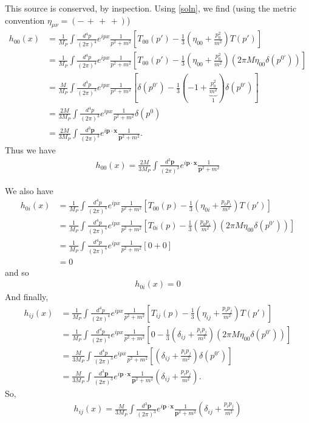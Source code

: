 \documentclass{book}
\theoremstyle{definition}
\newcommand{\nn}{\nonumber}
\newcommand{\f}[2]{\frac{#1}{#2}}
\newcommand{\lp}{\left(}
\newcommand{\rp}{\right)}
\newcommand{\lb}{\left[}
\newcommand{\rb}{\right]}
\begin{document}
This source is conserved, by inspection. Using \eqref{soln}, we find (using the metric convention $\eta_{\mu\nu} = (-\,+\,+\,+)$)
\begin{align}
h_{00}(x) &= \f{1}{M_P}\int \f{d^4p}{(2\pi)^4}e^{ipx}\f{1}{p^2 + m^2}\lb T_{00}(p') - \f{1}{3}\lp \eta_{00} + \f{p_0^2}{m^2} \rp T(p') \rb\nn\\
&= \f{1}{M_P}\int \f{d^4p}{(2\pi)^4}e^{ipx}\f{1}{p^2 + m^2}\lb T_{00}(p') - \f{1}{3}\lp \eta_{00} + \f{p_0^2}{m^2} \rp \lp 2\pi M \eta_{00}\delta(p^{0'})  \rp \rb\nn\\
&= \f{M}{M_P}\int \f{d^4p}{(2\pi)^3}e^{ipx}\f{1}{p^2 + m^2}\lb \delta(p^{0'}) - \f{1}{3}\lp -1 + \underbrace{\f{p_0^2}{m^2}}_{1} \rp \delta(p^{0'}) \rb\nn\\
&= \f{2M}{3M_P}\int \f{d^4p}{(2\pi)^3}e^{ipx}\f{1}{p^2 + m^2}\delta(p^0)\nn\\
&= \f{2M}{3M_P}\int \f{d^3\mathbf{p}}{(2\pi)^3}e^{i\mathbf{p}\cdot \mathbf{x}}\f{1}{\mathbf{p}^2 + m^2}.
\end{align}
Thus we have
\begin{align}
\boxed{h_{00}(x) = \f{2M}{3M_P}\int \f{d^3\mathbf{p}}{(2\pi)^3}e^{i\mathbf{p}\cdot \mathbf{x}}\f{1}{\mathbf{p}^2 + m^2}}
\end{align}

We also have
\begin{align}
h_{0i}(x) &= \f{1}{M_P}\int \f{d^4p}{(2\pi)^4}e^{ipx}\f{1}{p^2 + m^2}\lb T_{00}(p) - \f{1}{3}\lp \eta_{0i} + \f{p_0p_i}{m^2} \rp T(p') \rb\nn\\
&= \f{1}{M_P}\int \f{d^4p}{(2\pi)^4}e^{ipx}\f{1}{p^2 + m^2}\lb T_{0i}(p) - \f{1}{3}\lp  \f{p_0p_i}{m^2} \rp \lp 2\pi M \eta_{00}\delta(p^{0'})  \rp \rb\nn\\
&= \f{1}{M_P}\int \f{d^4p}{(2\pi)^4}e^{ipx}\f{1}{p^2 + m^2}\lb 0 + 0 \rb\nn\\
&= 0
\end{align}
and so
\begin{align}
\boxed{h_{0i}(x) = 0}
\end{align}
And finally,
\begin{align}
h_{ij}(x) &= \f{1}{M_P}\int \f{d^4p}{(2\pi)^4}e^{ipx}\f{1}{p^2 + m^2}\lb T_{ij}(p) - \f{1}{3}\lp \eta_{ij} + \f{p_i p_j}{m^2} \rp T(p') \rb\nn\\
&= \f{1}{M_P}\int \f{d^4p}{(2\pi)^4}e^{ipx}\f{1}{p^2 + m^2}\lb 0 - \f{1}{3}\lp \delta_{ij} + \f{p_i p_j}{m^2} \rp \lp 2\pi M \eta_{00}\delta(p^{0'})  \rp \rb\nn\\
&= \f{M}{3M_P}\int \f{d^4p}{(2\pi)^3}e^{ipx}\f{1}{p^2 + m^2}\lb \lp \delta_{ij} + \f{p_i p_j}{m^2} \rp  \delta(p^{0'})   \rb\nn\\
&= \f{M}{3M_P}\int \f{d^3\mathbf{p}}{(2\pi)^3}e^{i\mathbf{p}\cdot \mathbf{x}}\f{1}{\mathbf{p}^2 + m^2} \lp \delta_{ij} + \f{p_i p_j}{m^2} \rp.
\end{align}
So,
\begin{align}
\boxed{h_{ij}(x) = \f{M}{3M_P}\int \f{d^3\mathbf{p}}{(2\pi)^3}e^{i\mathbf{p}\cdot \mathbf{x}}\f{1}{\mathbf{p}^2 + m^2} \lp \delta_{ij} + \f{p_i p_j}{m^2} \rp}
\end{align}
\end{document}
